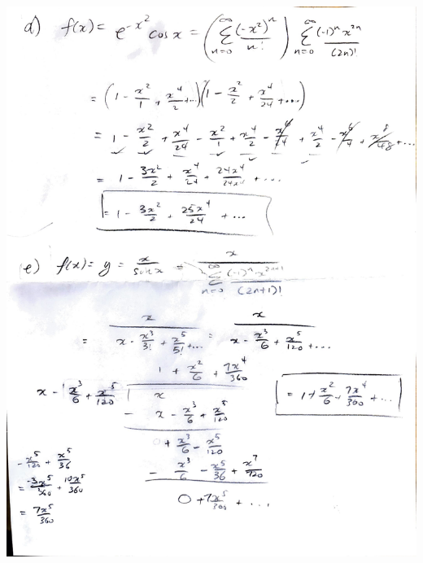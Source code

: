 \documentclass[preview, margin=0.6in]{standalone}
\begin{document}
\begin{center}
	\includegraphics[scale=0.58, page=2]{q6.pdf}
\end{center}
\end{document}
